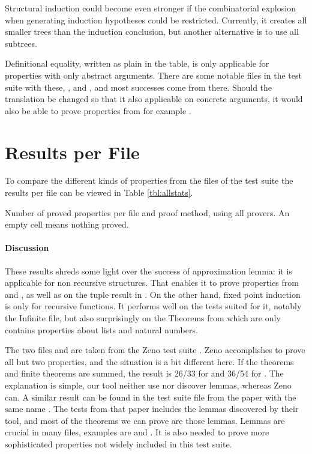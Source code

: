 Structural induction could become even stronger if the combinatorial
explosion when generating induction hypotheses could be
restricted. Currently, it creates all smaller trees than the induction
conclusion, but another alternative is to use all subtrees.

Definitional equality, written as plain in the table, is only
applicable for properties with only abstract arguments. There are some
notable files in the test suite with these, ,  and
, and most successes come from there. Should the translation
be changed so that it also applicable on concrete arguments, it would
also be able to prove properties from for example .


\section{Results per File}

To compare the different kinds of properties from the files of the
test suite the results per file can be viewed in Table
\ref{tbl:allstats}.

\begin{table}[h]

\caption{Number of proved properties per file and proof method, using
  all provers. An empty cell means nothing proved.
\label{tbl:allstats}
}
\end{table}

\paragraph{Discussion}

These results shreds some light over the success of approximation
lemma: it is applicable for non recursive structures. That enables it
to prove properties from  and , as well as on
the tuple result in . On the other hand, fixed point
induction is only for recursive functions. It performs well on the
tests suited for it, notably the Infinite file, but also surprisingly
on the Theorems from  which are only
contains properties about lists and natural numbers.

The two files  and  are taken from the Zeno test
suite \citep{zeno}. Zeno accomplishes to prove all but two properties,
and the situation is a bit different here. If the theorems and finite
theorems are summed, the result is 26/33 for  and 36/54 for
. The explanation is simple, our tool neither use nor
discover lemmas, whereas Zeno can. A similar result can be found in
the test suite file  from the paper with
the same name \citep{productiveuse}. The tests from that paper
includes the lemmas discovered by their tool, and most of the theorems
we can prove are those lemmas. Lemmas are crucial in many files,
examples are  and . It is also needed to
prove more sophisticated properties not widely included in this test
suite.

